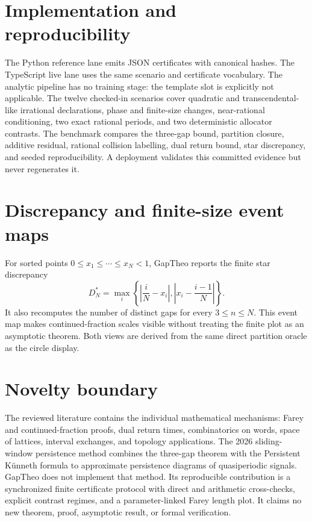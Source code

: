 \documentclass[11pt]{article}
\begin{document}
\section{Implementation and reproducibility}
The Python reference lane emits JSON certificates with canonical hashes. The
TypeScript live lane uses the same scenario and certificate vocabulary. The
analytic pipeline has no training stage: the template slot is explicitly not
applicable. The twelve checked-in scenarios cover quadratic and
transcendental-like irrational declarations, phase and finite-size changes,
near-rational conditioning, two exact rational periods, and two deterministic
allocator contrasts. The benchmark compares the three-gap bound, partition
closure, additive residual, rational collision labelling, dual return bound,
star discrepancy, and seeded reproducibility. A deployment validates this
committed evidence but never regenerates it.

\section{Discrepancy and finite-size event maps}
For sorted points $0\leq x_1\leq\cdots\leq x_N<1$, GapTheo reports the finite
star discrepancy
\[
 D_N^*=\max_i\left\{\left|\frac{i}{N}-x_i\right|,
 \left|x_i-\frac{i-1}{N}\right|\right\}.
\]
It also recomputes the number of distinct gaps for every $3\leq n\leq N$.
This event map makes continued-fraction scales visible without treating the
finite plot as an asymptotic theorem. Both views are derived from the same
direct partition oracle as the circle display.

\section{Novelty boundary}
The reviewed literature contains the individual mathematical mechanisms:
Farey and continued-fraction proofs, dual return times, combinatorics on words,
space of lattices, interval exchanges, and topology applications. The 2026
sliding-window persistence method combines the three-gap theorem with the
Persistent Künneth formula to approximate persistence diagrams of
quasiperiodic signals. GapTheo does not implement that method. Its
reproducible contribution is a synchronized finite certificate protocol with
direct and arithmetic cross-checks, explicit contrast regimes, and a
parameter-linked Farey length plot. It claims no new theorem, proof,
asymptotic result, or formal verification.
\end{document}
